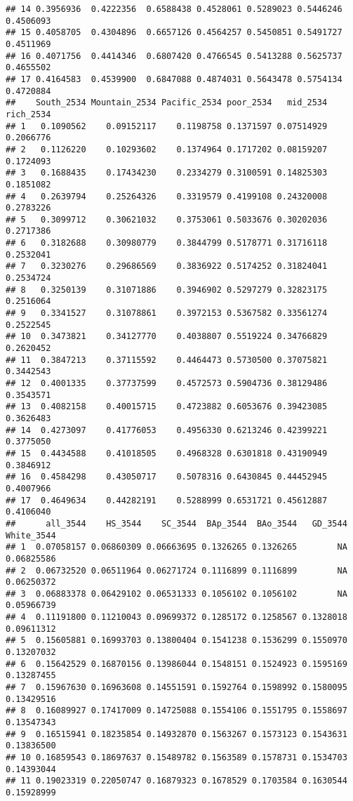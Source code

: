 \documentclass[
]{article}
\begin{document}
\begin{verbatim}
## 14 0.3956936  0.4222356  0.6588438 0.4528061 0.5289023 0.5446246    0.4506093
## 15 0.4058705  0.4304896  0.6657126 0.4564257 0.5450851 0.5491727    0.4511969
## 16 0.4071756  0.4414346  0.6807420 0.4766545 0.5413288 0.5625737    0.4655502
## 17 0.4164583  0.4539900  0.6847088 0.4874031 0.5643478 0.5754134    0.4720884
##    South_2534 Mountain_2534 Pacific_2534 poor_2534   mid_2534 rich_2534
## 1   0.1090562    0.09152117    0.1198758 0.1371597 0.07514929 0.2066776
## 2   0.1126220    0.10293602    0.1374964 0.1717202 0.08159207 0.1724093
## 3   0.1688435    0.17434230    0.2334279 0.3100591 0.14825303 0.1851082
## 4   0.2639794    0.25264326    0.3319579 0.4199108 0.24320008 0.2783226
## 5   0.3099712    0.30621032    0.3753061 0.5033676 0.30202036 0.2717386
## 6   0.3182688    0.30980779    0.3844799 0.5178771 0.31716118 0.2532041
## 7   0.3230276    0.29686569    0.3836922 0.5174252 0.31824041 0.2534724
## 8   0.3250139    0.31071886    0.3946902 0.5297279 0.32823175 0.2516064
## 9   0.3341527    0.31078861    0.3972153 0.5367582 0.33561274 0.2522545
## 10  0.3473821    0.34127770    0.4038807 0.5519224 0.34766829 0.2620452
## 11  0.3847213    0.37115592    0.4464473 0.5730500 0.37075821 0.3442543
## 12  0.4001335    0.37737599    0.4572573 0.5904736 0.38129486 0.3543571
## 13  0.4082158    0.40015715    0.4723882 0.6053676 0.39423085 0.3626483
## 14  0.4273097    0.41776053    0.4956330 0.6213246 0.42399221 0.3775050
## 15  0.4434588    0.41018505    0.4968328 0.6301818 0.43190949 0.3846912
## 16  0.4584298    0.43050717    0.5078316 0.6430845 0.44452945 0.4007966
## 17  0.4649634    0.44282191    0.5288999 0.6531721 0.45612887 0.4106040
##      all_3544    HS_3544    SC_3544  BAp_3544  BAo_3544   GD_3544 White_3544
## 1  0.07058157 0.06860309 0.06663695 0.1326265 0.1326265        NA 0.06825586
## 2  0.06732520 0.06511964 0.06271724 0.1116899 0.1116899        NA 0.06250372
## 3  0.06883378 0.06429102 0.06531333 0.1056102 0.1056102        NA 0.05966739
## 4  0.11191800 0.11210043 0.09699372 0.1285172 0.1258567 0.1328018 0.09611312
## 5  0.15605881 0.16993703 0.13800404 0.1541238 0.1536299 0.1550970 0.13207032
## 6  0.15642529 0.16870156 0.13986044 0.1548151 0.1524923 0.1595169 0.13287455
## 7  0.15967630 0.16963608 0.14551591 0.1592764 0.1598992 0.1580095 0.13429516
## 8  0.16089927 0.17417009 0.14725088 0.1554106 0.1551795 0.1558697 0.13547343
## 9  0.16515941 0.18235854 0.14932870 0.1563267 0.1573123 0.1543631 0.13836500
## 10 0.16859543 0.18697637 0.15489782 0.1563589 0.1578731 0.1534703 0.14393044
## 11 0.19023319 0.22050747 0.16879323 0.1678529 0.1703584 0.1630544 0.15928999

\end{verbatim}
\end{document}
